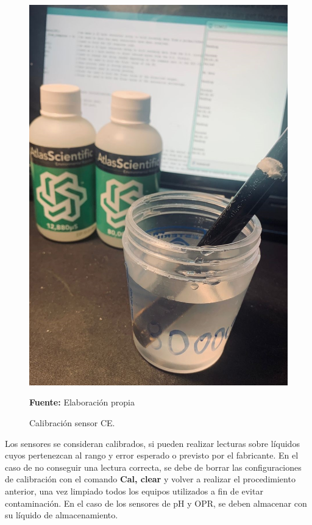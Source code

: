 \begin{figure}[H]
        \centering
        \includegraphics[scale=0.5]{Imagenes/cap4/calibracion.jpeg}
        \caption {Calibraci\'on sensor CE. }{\textbf{Fuente:}
        Elaboraci\'on propia}
        \label{fig:kit}
        
\end{figure}

Los sensores se consideran calibrados, si pueden realizar lecturas sobre l\'iquidos cuyos pertenezcan al rango y error esperado o previsto por el fabricante. 
En el caso de no conseguir una lectura correcta, se debe de borrar las configuraciones de calibraci\'on con el comando \textbf{Cal, clear} y volver a realizar el procedimiento anterior, una vez limpiado todos los equipos utilizados a fin de evitar contaminación. 
En el caso de los sensores de pH y OPR, se deben almacenar con su l\'iquido de almacenamiento.

